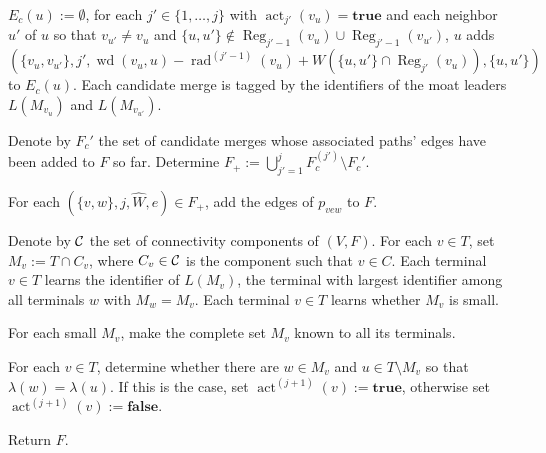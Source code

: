 \documentclass[letterpaper,11pt]{article}
\newcommand{\Comp}{\lambda}
\DeclareMathOperator{\act}{act}
\DeclareMathOperator{\moat}{rad}
\DeclareMathOperator{\Wd}{wd}
\DeclareMathOperator{\reg}{Reg}
\newcommand{\true}{\mathbf{true}}
\newcommand{\false}{\mathbf{false}}
\begin{document}
\begin{compactenum}
\begin{compactenum}
$E_c(u):=\emptyset$, for each $j'\in \{1,\ldots,j\}$ with $\act_{j'}(v_u)=\true$
and each neighbor $u'$ of $u$ so that $v_{u'}\neq v_u$ and $\{u,u'\}\notin
\reg_{j'-1}(v_u)\cup \reg_{j'-1}(v_{u'})$, $u$ adds
$(\{v_u,v_{u'}\},j',\Wd(v_u,u)-\moat^{(j'-1)}(v_u)+W(\{u,u'\}\cap
\reg_{j'}(v_u)),\{u,u'\})$ to $E_c(u)$. Each candidate merge is tagged by the
identifiers of the moat leaders $L(M_{v_u})$ and $L(M_{v_{u'}})$.
\item Denote by $F_c'$ the set of candidate merges whose associated paths' edges
have been added to $F$ so far. Determine $F_+:=\bigcup_{j'=1}^j
F_c^{(j')}\setminus F_c'$.
\item For each $(\{v,w\},j,\hat{W},e)\in F_+$, add the edges of $p_{vew}$ to
$F$.
\item Denote by ${\cal C}$ the set of connectivity components of $(V,F)$. For
each $v\in T$, set $M_v:=T\cap C_v$, where $C_v\in {\cal C}$ is the component
such that $v\in C$. Each terminal $v\in T$ learns the identifier of $L(M_v)$,
the terminal with largest identifier among all terminals $w$ with $M_w=M_v$.
Each terminal $v\in T$ learns whether $M_v$ is small.
\item For each small $M_v$, make the complete set $M_v$ known to all its
terminals.
\item For each $v\in T$, determine whether there are $w\in M_v$ and $u\in
T\setminus M_v$ so that $\Comp(w)=\Comp(u)$. If this is the case, set
$\act^{(j+1)}(v):=\true$, otherwise set $\act^{(j+1)}(v):=\false$.
\end{compactenum}
\item Return $F$.
\end{compactenum}
\end{document}
